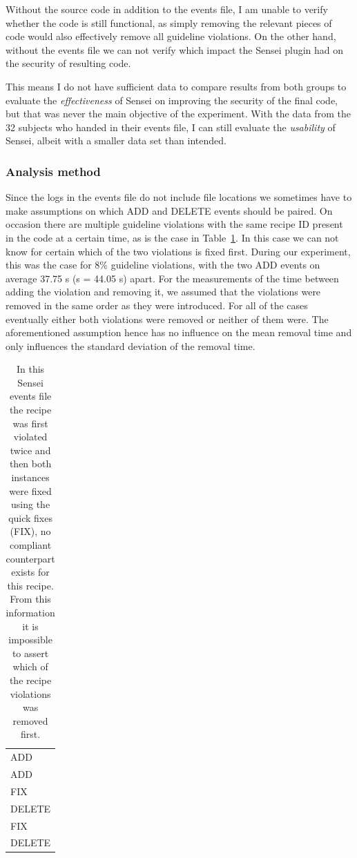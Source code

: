 Without the source code in addition to the events file, I am unable to verify whether the code is still functional, as simply removing the relevant pieces of code would also effectively remove all guideline violations.
On the other hand, without the events file we can not verify which impact the Sensei plugin had on the security of resulting code.

This means I do not have sufficient data to compare results from both groups to evaluate the \textit{effectiveness} of Sensei on improving the security of the final code, but that was never the main objective of the experiment.
With the data from the 32 subjects who handed in their events file, I can still evaluate the \textit{usability} of Sensei, albeit with a smaller data set than intended.

\subsubsection{Analysis method}
\label{sec:analysis}
Since the logs in the events file do not include file locations we sometimes have to make assumptions on which ADD and DELETE events should be paired.
On occasion there are multiple guideline violations with the same recipe ID present in the code at a certain time, as is the case in Table~\ref{tab:recipe2}. 
In this case we can not know for certain which of the two violations is fixed first.
During our experiment, this was the case for 8\% guideline violations, with the two ADD events on average 37.75 s (s = 44.05 s) apart.
For the measurements of the time between adding the violation and removing it, we assumed that the violations were removed in the same order as they were introduced.
For all of the cases eventually either both violations were removed or neither of them were.
The aforementioned assumption hence has no influence on the mean removal time and only influences the standard deviation of the removal time. 

\begin{table}
    \centering
    \begin{tabular}{|l|}
      \hline
      \cellcolor{scw-orange!30}
      ADD \\
      \cellcolor{scw-orange!30}
      ADD \\
      FIX \\
      \cellcolor{scw-teal!30}
      DELETE \\
      FIX \\
      \cellcolor{scw-teal!30}
      DELETE \\
      \hline
    \end{tabular}
    \caption[Sensei events file with multiple violations at the same time]{In this Sensei events file the recipe was first violated twice and then both instances were fixed using the quick fixes (FIX), no compliant counterpart exists for this recipe. From this information it is impossible to assert which of the recipe violations was removed first.}
    \label{tab:recipe2}
\end{table}

